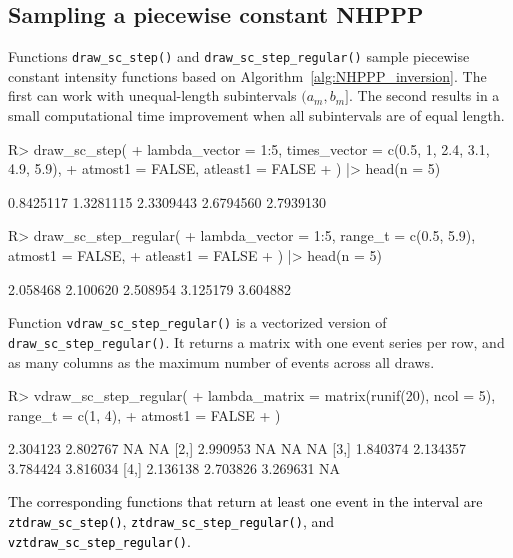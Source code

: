 \documentclass[10pt,letterpaper]{article}
\newcommand{\fct}[1]{\texttt{#1()}}
\newcommand{\red}[1]{\textcolor{black}{#1}}
\begin{document}
\subsection{Sampling a piecewise constant NHPPP}\label{sec:sample-nhppp-pc}

Functions \fct{draw\_sc\_step} and \fct{draw\_sc\_step\_regular} sample piecewise constant intensity functions based on Algorithm~\ref{alg:NHPPP_inversion}. The first can work with unequal-length subintervals $(a_m, b_m]$. The second results in a small computational time improvement when all subintervals are of equal length.
\begin{Schunk}
\begin{Sinput}
R> draw_sc_step(
+    lambda_vector = 1:5, times_vector = c(0.5, 1, 2.4, 3.1, 4.9, 5.9),
+    atmost1 = FALSE, atleast1 = FALSE
+  ) |> head(n = 5)
\end{Sinput}
\begin{Soutput}
[1] 0.8425117 1.3281115 2.3309443 2.6794560 2.7939130
\end{Soutput}
\begin{Sinput}
R> draw_sc_step_regular(
+    lambda_vector = 1:5, range_t = c(0.5, 5.9), atmost1 = FALSE,
+    atleast1 = FALSE
+  ) |> head(n = 5)
\end{Sinput}
\begin{Soutput}
[1] 2.058468 2.100620 2.508954 3.125179 3.604882
\end{Soutput}
\end{Schunk}


Function \fct{vdraw\_sc\_step\_regular} is a vectorized version of \fct{draw\_sc\_step\_regular}. It returns a matrix with one event series per row, and as many columns as the maximum number of events across all draws. 

\begin{Schunk}
\begin{Sinput}
R> vdraw_sc_step_regular(
+    lambda_matrix = matrix(runif(20), ncol = 5), range_t = c(1, 4),
+    atmost1 = FALSE
+  )
\end{Sinput}
\begin{Soutput}
         [,1]     [,2]     [,3]     [,4]
[1,] 2.304123 2.802767       NA       NA
[2,] 2.990953       NA       NA       NA
[3,] 1.840374 2.134357 3.784424 3.816034
[4,] 2.136138 2.703826 3.269631       NA
\end{Soutput}
\end{Schunk}

\noindent \red{The corresponding functions that return at least one event in the interval are \fct{ztdraw\_sc\_step}, \fct{ztdraw\_sc\_step\_regular}, and \fct{vztdraw\_sc\_step\_regular}. }
\end{document}
